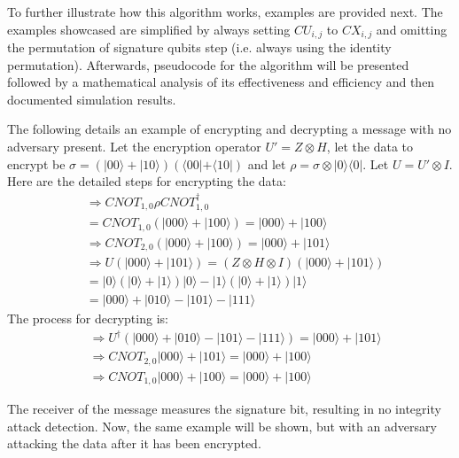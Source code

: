 To further illustrate how this algorithm works, examples are provided next. The examples showcased are simplified by always setting $\mathit{CU}_{i,j}$ to $\mathit{CX}_{i,j}$ and omitting the permutation of signature qubits step (i.e. always using the identity permutation). Afterwards, pseudocode for the algorithm will be presented followed by a mathematical analysis of its effectiveness and efficiency and then documented simulation results.
\begin{example}
\label{ex:EnhancedClifford1}
	The following details an example of encrypting and decrypting a message with no adversary present. Let the encryption operator $U' = Z \otimes H$, let the data to encrypt be $\sigma = (|00\rangle + |10\rangle) (\langle00| + \langle10|)$ and let $\rho = \sigma \otimes |0\rangle \langle0|$. Let $U = U' \otimes I$. Here are the detailed steps for encrypting the data:
	\begin{align}
	& \Rightarrow \mathit{CNOT}_{1,0}\rho \mathit{CNOT}_{1,0}^{\dagger} \\ 
	&= \mathit{CNOT}_{1,0}(|000\rangle + |100\rangle) = |000\rangle + |100\rangle\\
	& \Rightarrow \mathit{CNOT}_{2,0}(|000\rangle + |100\rangle) = |000\rangle + |101\rangle\\
	& \Rightarrow U(|000\rangle + |101\rangle) = (Z \otimes H \otimes I)(|000\rangle + |101\rangle)\\ 
	&= |0\rangle(|0\rangle + |1\rangle)|0\rangle - |1\rangle(|0\rangle + |1\rangle)|1\rangle\\
	&= |000\rangle + |010\rangle - |101\rangle - |111\rangle
	\end{align}
	The process for decrypting is:
	\begin{align}
	& \Rightarrow U^{\dagger}(|000\rangle + |010\rangle - |101\rangle - |111\rangle) = |000\rangle + |101\rangle\\ 
	& \Rightarrow \mathit{CNOT}_{2,0} |000\rangle + |101\rangle = |000\rangle + |100\rangle\\
	& \Rightarrow \mathit{CNOT}_{1,0} |000\rangle + |100\rangle = |000\rangle + |100\rangle
	\end{align}
\end{example}
The receiver of the message measures the signature bit, resulting in no integrity attack detection. Now, the same example will be shown, but with an adversary attacking the data after it has been encrypted.
